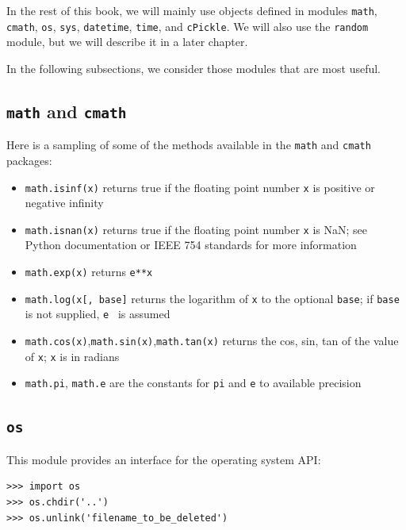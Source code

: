 \documentclass[justified,sixbynine]{tufte-book}
\def\ft{\small\tt}
\theoremstyle{plain}%
\theoremstyle{definition}
\theoremstyle{remark}
\begin{document}
\begin{fullwidth}
In the rest of this book, we will mainly use objects defined in modules {\ft math}, {\ft cmath}, {\ft os},  {\ft sys}, {\ft datetime}, {\ft time}, and {\ft cPickle}. We will also use the {\ft random} module, but we will describe it in a later chapter.

In the following subsections, we consider those modules that are most useful.

\goodbreak\subsection{{\ft math} and {\ft cmath}}


Here is a sampling of some of the methods available in the {\ft math} and {\ft cmath} packages:
\begin{itemize}
\item {\ft math.isinf(x)} returns true if the floating point number {\ft x} is positive or negative infinity

\item {\ft math.isnan(x)} returns true if the floating point number {\ft x} is NaN; see Python documentation or IEEE 754 standards for more information

\item {\ft math.exp(x)} returns {\ft e**x}

\item {\ft math.log(x[, base]} returns the logarithm of {\ft x} to the optional {\ft base}; if {\ft base} is not supplied, {\ft e } is assumed

\item {\ft math.cos(x)},{\ft math.sin(x)},{\ft math.tan(x)} returns the cos, sin, tan of the value of {\ft x};  {\ft x} is in radians

\item {\ft math.pi}, {\ft math.e} are the constants for {\ft pi} and {\ft e} to available precision
\end{itemize}



\goodbreak\subsection{{\ft os}}

  

This module provides an interface for the operating system API:
\begin{lstlisting}
>>> import os
>>> os.chdir('..')
>>> os.unlink('filename_to_be_deleted')
\end{lstlisting}


\end{fullwidth}
\end{document}
